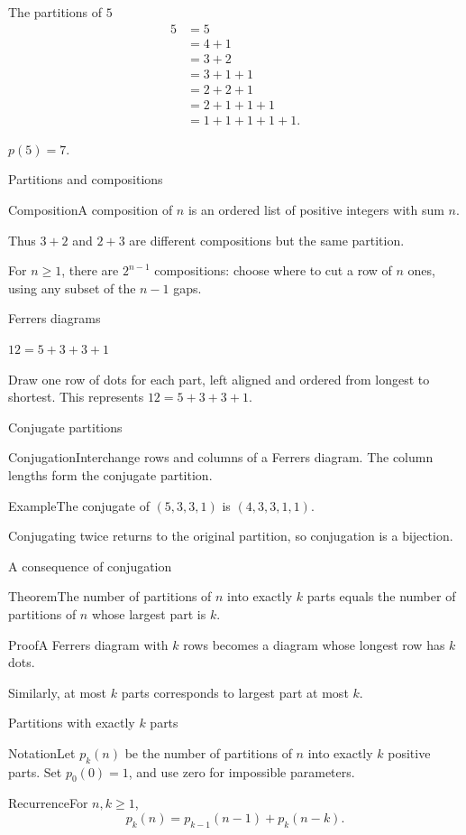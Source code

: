 \documentclass[aspectratio=169,11pt]{beamer}
\newcommand{\Def}[2]{\begin{block}{#1}#2\end{block}}
\newcommand{\Thm}[2]{\begin{block}{#1}#2\end{block}}
\renewcommand{\Proof}[1]{\begin{block}{Proof}\normalsize #1\end{block}}
\renewcommand{\Example}[1]{\begin{block}{Example}#1\end{block}}
\newcommand{\gap}{\par\medskip}
\begin{document}
\begin{frame}{The partitions of $5$}
\large
\begin{align*}
5&=5\\&=4+1\\&=3+2\\&=3+1+1\\&=2+2+1\\&=2+1+1+1\\&=1+1+1+1+1.
\end{align*}
\begin{center}$p(5)=7$.\end{center}
\end{frame}
\begin{frame}{Partitions and compositions}
\large
\Def{Composition}{A composition of $n$ is an ordered list of positive integers with sum $n$.}
\gap Thus $3+2$ and $2+3$ are different compositions but the same partition.
\gap For $n\geq1$, there are $2^{n-1}$ compositions: choose where to cut a row of $n$ ones, using any subset of the $n-1$ gaps.
\end{frame}
\begin{frame}{Ferrers diagrams}
\large
\begin{center}\qquad$12=5+3+3+1$\end{center}
\gap Draw one row of dots for each part, left aligned and ordered from longest to shortest. This represents $12=5+3+3+1$.
\end{frame}
\begin{frame}{Conjugate partitions}
\large
\Def{Conjugation}{Interchange rows and columns of a Ferrers diagram. The column lengths form the conjugate partition.}
\Example{The conjugate of $(5,3,3,1)$ is $(4,3,3,1,1)$.}
\gap Conjugating twice returns to the original partition, so conjugation is a bijection.
\end{frame}
\begin{frame}{A consequence of conjugation}
\large
\Thm{Theorem}{The number of partitions of $n$ into exactly $k$ parts equals the number of partitions of $n$ whose largest part is $k$.}
\Proof{A Ferrers diagram with $k$ rows becomes a diagram whose longest row has $k$ dots.}
\gap Similarly, at most $k$ parts corresponds to largest part at most $k$.
\end{frame}
\begin{frame}{Partitions with exactly $k$ parts}
\large
\Def{Notation}{Let $p_k(n)$ be the number of partitions of $n$ into exactly $k$ positive parts. Set $p_0(0)=1$, and use zero for impossible parameters.}
\Thm{Recurrence}{For $n,k\geq1$,
\[p_k(n)=p_{k-1}(n-1)+p_k(n-k).\]}
\end{frame}
\end{document}
